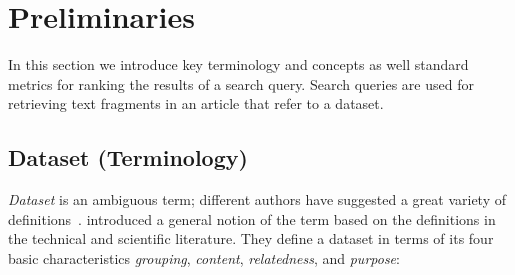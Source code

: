 \documentclass{IOS-Book-Article}
\begin{document}
\section{Preliminaries}
\label{sec:preliminaries}
In this section we introduce key terminology and concepts as well standard metrics for ranking the results of a search query.
Search queries are used for retrieving text fragments in an article that refer to a dataset.%

\subsection{Dataset (Terminology)} 
\emph{Dataset} is an ambiguous term; different authors have suggested a great variety of definitions~\cite{peplerpreservation}.
\citeauthor{renear2010definitions} introduced a general notion of the term based on the definitions in the technical and scientific literature.
They define a dataset in terms of its four basic characteristics \emph{grouping}, \emph{content}, \emph{relatedness}, and \emph{purpose}:
\end{document}
